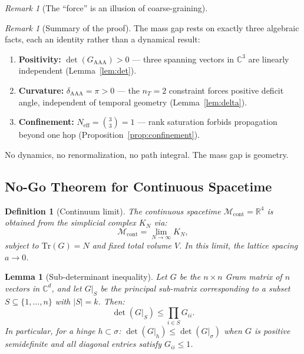 \documentclass[12pt]{article}
\newtheorem{lemma}[theorem]{Lemma}
\newtheorem{definition}[theorem]{Definition}
\theoremstyle{remark}
\newtheorem{remark}[theorem]{Remark}
\theoremstyle{definition}
\newcommand{\CC}{\mathbb{C}}
\newcommand{\RR}{\mathbb{R}}
\begin{document}
\begin{remark}[The ``force'' is an illusion of coarse-graining]
\begin{remark}[Summary of the proof]
The mass gap rests on exactly three algebraic facts, each an identity
rather than a dynamical result:
\begin{enumerate}
\item[(i)] \textbf{Positivity:} $\det(G_{\mathrm{AAA}}) > 0$ --- three
  spanning vectors in $\CC^3$ are linearly independent
  (Lemma~\ref{lem:det}).
\item[(ii)] \textbf{Curvature:} $\delta_{\mathrm{AAA}} = \pi > 0$ ---
  the $n_T = 2$ constraint forces positive deficit angle, independent
  of temporal geometry (Lemma~\ref{lem:delta}).
\item[(iii)] \textbf{Confinement:} $N_{\mathrm{eff}} = \binom{3}{3} = 1$
  --- rank saturation forbids propagation beyond one hop
  (Proposition~\ref{prop:confinement}).
\end{enumerate}
No dynamics, no renormalization, no path integral.  The mass gap is
geometry.
\end{remark}

\subsection{No-Go Theorem for Continuous Spacetime}
\label{sec:nogo}

\begin{definition}[Continuum limit]
\label{def:continuum}
The continuous spacetime $\mathcal{M}_{\mathrm{cont}} = \RR^4$ is
obtained from the simplicial complex $K_N$ via:
\begin{equation}
\mathcal{M}_{\mathrm{cont}} = \lim_{N \to \infty} K_N,
\end{equation}
subject to $\mathrm{Tr}(G) = N$ and fixed total volume $V$.
In this limit, the lattice spacing $a \to 0$.
\end{definition}

\begin{lemma}[Sub-determinant inequality]
\label{lem:subdet}
Let $G$ be the $n \times n$ Gram matrix of $n$ vectors in $\CC^d$,
and let $G|_S$ be the principal sub-matrix corresponding to a subset
$S \subseteq \{1, \ldots, n\}$ with $|S| = k$.  Then:
\begin{equation}
\det(G|_S) \leq \prod_{i \in S} G_{ii}.
\end{equation}
In particular, for a hinge $h \subset \sigma$:
$\det(G|_h) \leq \det(G|_\sigma)$ when $G$ is positive semidefinite
and all diagonal entries satisfy $G_{ii} \leq 1$.
\end{lemma}


\end{remark}
\end{document}
